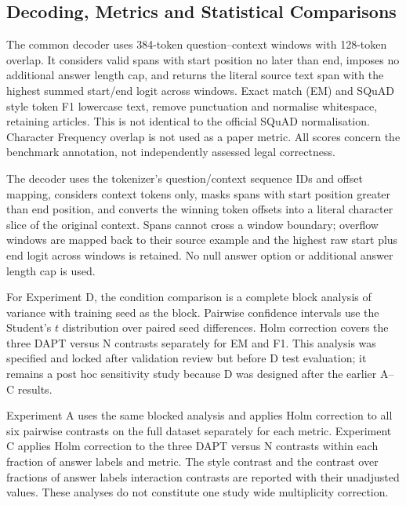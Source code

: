 \documentclass[pdflatex,sn-basic]{sn-jnl}
\begin{document}
\subsection{Decoding, Metrics and Statistical Comparisons}

The common decoder uses 384-token question--context windows with 128-token
overlap. It considers valid spans with start position no later than end,
imposes no additional answer length cap, and returns the literal source text
span with the highest summed start/end logit across windows.
Exact match (EM) and SQuAD style token F1 lowercase text, remove punctuation
and normalise whitespace, retaining articles. This is not identical to the official SQuAD
normalisation. Character Frequency overlap is not used as a paper metric.
All scores concern the benchmark annotation, not independently assessed legal
correctness.

The decoder uses the tokenizer's question/context sequence IDs and offset
mapping, considers context tokens only, masks spans with start position greater
than end position, and converts the winning token offsets into a literal
character slice of the original context. Spans cannot cross a window boundary;
overflow windows are mapped back to their source example and the highest raw
start plus end logit across windows is retained. No null answer option or
additional answer length cap is used.

For Experiment D, the condition comparison is a complete block analysis of
variance with training seed as the block. Pairwise confidence intervals use
the Student's \(t\) distribution over paired seed differences. Holm correction
covers the three DAPT versus N contrasts separately for EM and F1. This
analysis was specified and locked after validation review but before D test
evaluation; it remains a post hoc sensitivity study because D was designed
after the earlier A--C results.

Experiment A uses the same blocked analysis and applies Holm correction to all
six pairwise contrasts on the full dataset separately for each metric. Experiment C
applies Holm correction to the three DAPT versus N contrasts within each
fraction of answer labels and metric. The style contrast and the contrast over fractions of answer labels
interaction contrasts are reported with their unadjusted values. These
analyses do not constitute one study wide multiplicity correction.
\end{document}
